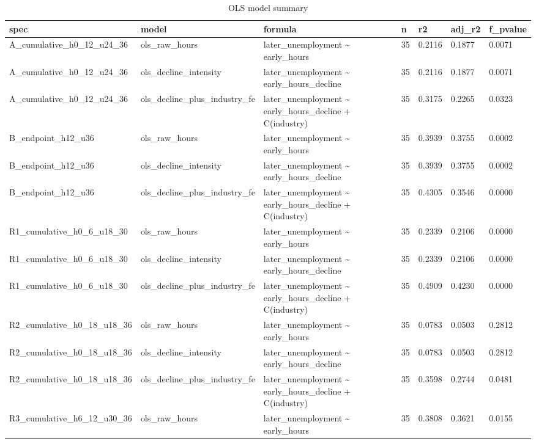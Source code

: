 \begin{table}
\centering
\caption{OLS model summary}
\begin{tabular}{lllllll}
\hline
spec & model & formula & n & r2 & adj\_r2 & f\_pvalue \\
\hline
A\_cumulative\_h0\_12\_u24\_36 & ols\_raw\_hours & later\_unemployment \textasciitilde{} early\_hours & 35 & 0.2116 & 0.1877 & 0.0071 \\
A\_cumulative\_h0\_12\_u24\_36 & ols\_decline\_intensity & later\_unemployment \textasciitilde{} early\_hours\_decline & 35 & 0.2116 & 0.1877 & 0.0071 \\
A\_cumulative\_h0\_12\_u24\_36 & ols\_decline\_plus\_industry\_fe & later\_unemployment \textasciitilde{} early\_hours\_decline + C(industry) & 35 & 0.3175 & 0.2265 & 0.0323 \\
B\_endpoint\_h12\_u36 & ols\_raw\_hours & later\_unemployment \textasciitilde{} early\_hours & 35 & 0.3939 & 0.3755 & 0.0002 \\
B\_endpoint\_h12\_u36 & ols\_decline\_intensity & later\_unemployment \textasciitilde{} early\_hours\_decline & 35 & 0.3939 & 0.3755 & 0.0002 \\
B\_endpoint\_h12\_u36 & ols\_decline\_plus\_industry\_fe & later\_unemployment \textasciitilde{} early\_hours\_decline + C(industry) & 35 & 0.4305 & 0.3546 & 0.0000 \\
R1\_cumulative\_h0\_6\_u18\_30 & ols\_raw\_hours & later\_unemployment \textasciitilde{} early\_hours & 35 & 0.2339 & 0.2106 & 0.0000 \\
R1\_cumulative\_h0\_6\_u18\_30 & ols\_decline\_intensity & later\_unemployment \textasciitilde{} early\_hours\_decline & 35 & 0.2339 & 0.2106 & 0.0000 \\
R1\_cumulative\_h0\_6\_u18\_30 & ols\_decline\_plus\_industry\_fe & later\_unemployment \textasciitilde{} early\_hours\_decline + C(industry) & 35 & 0.4909 & 0.4230 & 0.0000 \\
R2\_cumulative\_h0\_18\_u18\_36 & ols\_raw\_hours & later\_unemployment \textasciitilde{} early\_hours & 35 & 0.0783 & 0.0503 & 0.2812 \\
R2\_cumulative\_h0\_18\_u18\_36 & ols\_decline\_intensity & later\_unemployment \textasciitilde{} early\_hours\_decline & 35 & 0.0783 & 0.0503 & 0.2812 \\
R2\_cumulative\_h0\_18\_u18\_36 & ols\_decline\_plus\_industry\_fe & later\_unemployment \textasciitilde{} early\_hours\_decline + C(industry) & 35 & 0.3598 & 0.2744 & 0.0481 \\
R3\_cumulative\_h6\_12\_u30\_36 & ols\_raw\_hours & later\_unemployment \textasciitilde{} early\_hours & 35 & 0.3808 & 0.3621 & 0.0155 \\

\end{tabular}
\end{table}
